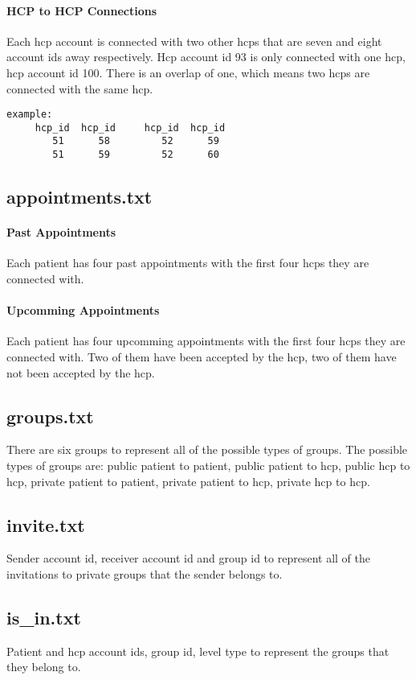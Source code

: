 \paragraph{HCP to HCP Connections}  Each hcp account is connected with two other hcps that are seven and eight account ids away respectively.  Hcp account id 93 is only connected with one hcp, hcp account id 100.  There is an overlap of one, which means two hcps are connected with the same hcp.
\begin{verbatim}
example:
     hcp_id  hcp_id     hcp_id  hcp_id		
        51      58         52      59
        51      59         52      60
\end{verbatim}

\subsection{appointments.txt}
\paragraph{Past Appointments}  Each patient has four past appointments with the first four hcps they are connected with.
\paragraph{Upcomming Appointments} Each patient has four upcomming appointments with the first four hcps they are connected with.  Two of them have been accepted by the hcp, two of them have not been accepted by the hcp.

\subsection{groups.txt}  There are six groups to represent all of the possible types of groups.  The possible types of groups are: public patient to patient, public patient to hcp, public hcp to hcp, private patient to patient, private patient to hcp, private hcp to hcp.

\subsection{invite.txt}
Sender account id, receiver account id and group id to represent all of the invitations to private groups that the sender belongs to.

\subsection{is\_in.txt}
Patient and hcp account ids, group id, level type to represent the groups that they belong to.

